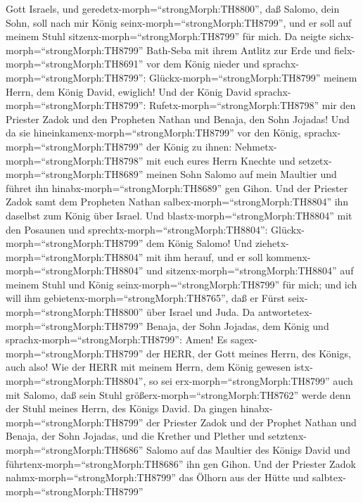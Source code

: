 Gott Israels, und geredetx-morph=``strongMorph:TH8800'', daß Salomo,
dein Sohn, soll nach mir König seinx-morph=``strongMorph:TH8799'', und
er soll auf meinem Stuhl sitzenx-morph=``strongMorph:TH8799'' für mich.
 Da neigte sichx-morph=``strongMorph:TH8799'' Bath-Seba mit
ihrem Antlitz zur Erde und fielx-morph=``strongMorph:TH8691'' vor dem
König nieder und sprachx-morph=``strongMorph:TH8799'':
Glückx-morph=``strongMorph:TH8799'' meinem Herrn, dem König David,
ewiglich!  Und der König David
sprachx-morph=``strongMorph:TH8799'':
Rufetx-morph=``strongMorph:TH8798'' mir den Priester Zadok und den
Propheten Nathan und Benaja, den Sohn Jojadas! Und da sie
hineinkamenx-morph=``strongMorph:TH8799'' vor den König, 
sprachx-morph=``strongMorph:TH8799'' der König zu ihnen:
Nehmetx-morph=``strongMorph:TH8798'' mit euch eures Herrn Knechte und
setzetx-morph=``strongMorph:TH8689'' meinen Sohn Salomo auf mein
Maultier und führet ihn hinabx-morph=``strongMorph:TH8689'' gen Gihon.
 Und der Priester Zadok samt dem Propheten Nathan
salbex-morph=``strongMorph:TH8804'' ihn daselbst zum König über Israel.
Und blastx-morph=``strongMorph:TH8804'' mit den Posaunen und
sprechtx-morph=``strongMorph:TH8804'':
Glückx-morph=``strongMorph:TH8799'' dem König Salomo!  Und
ziehetx-morph=``strongMorph:TH8804'' mit ihm herauf, und er soll
kommenx-morph=``strongMorph:TH8804'' und
sitzenx-morph=``strongMorph:TH8804'' auf meinem Stuhl und König
seinx-morph=``strongMorph:TH8799'' für mich; und ich will ihm
gebietenx-morph=``strongMorph:TH8765'', daß er Fürst
seix-morph=``strongMorph:TH8800'' über Israel und Juda.  Da
antwortetex-morph=``strongMorph:TH8799'' Benaja, der Sohn Jojadas, dem
König und sprachx-morph=``strongMorph:TH8799'': Amen! Es
sagex-morph=``strongMorph:TH8799'' der HERR, der Gott meines Herrn, des
Königs, auch also!  Wie der HERR mit meinem Herrn, dem
König gewesen istx-morph=``strongMorph:TH8804'', so sei
erx-morph=``strongMorph:TH8799'' auch mit Salomo, daß sein Stuhl
größerx-morph=``strongMorph:TH8762'' werde denn der Stuhl meines Herrn,
des Königs David.  Da gingen
hinabx-morph=``strongMorph:TH8799'' der Priester Zadok und der Prophet
Nathan und Benaja, der Sohn Jojadas, und die Krether und Plether und
setztenx-morph=``strongMorph:TH8686'' Salomo auf das Maultier des Königs
David und führtenx-morph=``strongMorph:TH8686'' ihn gen Gihon.
 Und der Priester Zadok nahmx-morph=``strongMorph:TH8799''
das Ölhorn aus der Hütte und salbtex-morph=``strongMorph:TH8799''

